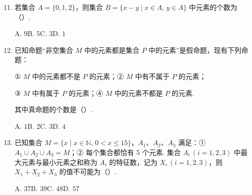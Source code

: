 \documentclass[a4paper,11pt]{article}
\begin{document}
\begin{enumerate}
\setcounter{enumi}{10}

\item 若集合 $A=\{0,1,2\}$，则集合 $B=\{x-y\mid x\in A,\,y\in A\}$ 中元素的个数为\mbox{（\quad）.}

\keepwithprev
A. $9$\qquad B. $5$\qquad C. $3$\qquad D. $1$


\ifanswer
\solbegin
{}
\solend

\fi

\item 已知命题“非空集合 $M$ 中的元素都是集合 $P$ 中的元素”是假命题，现有下列命题：

① $M$ 中的元素都不是 $P$ 的元素；\quad ② $M$ 中有不属于 $P$ 的元素；

③ $M$ 中有属于 $P$ 的元素；\quad ④ $M$ 中的元素不都是 $P$ 的元素.

其中真命题的个数是\mbox{（\quad）.}

\keepwithprev
A. $1$\qquad B. $2$\qquad C. $3$\qquad D. $4$


\ifanswer
\solbegin
{}
\solend

\fi

\item 已知集合 $M=\{x\mid x\in\mathbb{N},\,0<x\leqslant 15\}$，$A_1$、$A_2$、$A_3$ 满足：① $A_1\cup A_2\cup A_3=M$；② 每个集合都恰有 5 个元素. 集合 $A_i\,(i=1,2,3)$ 中最大元素与最小元素之和称为 $A_i$ 的特征数，记为 $X_i\,(i=1,2,3)$，则 $X_1+X_2+X_3$ 的值不可能为\mbox{（\quad）.}

\keepwithprev
A. $37$\qquad B. $39$\qquad C. $48$\qquad D. $57$



\end{enumerate}
\end{document}

